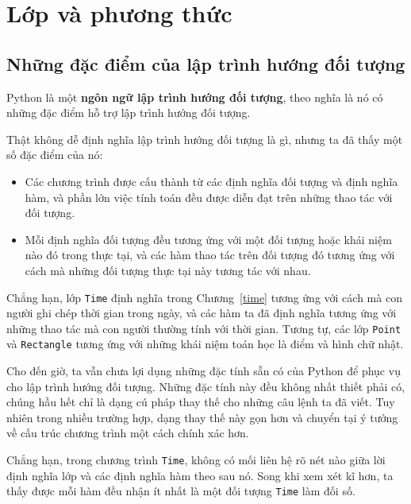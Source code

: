 \documentclass[11pt]{book}
\begin{document}
\chapter{Lớp và phương thức}


\section{Những đặc điểm của lập trình hướng đối tượng}


Python là một {\bf ngôn ngữ lập trình hướng đối tượng}, theo nghĩa là nó
có những đặc điểm hỗ trợ lập trình hướng đối tượng.

Thật không dễ định nghĩa lập trình hướng đối tượng là gì, nhưng ta đã
thấy một số đặc điểm của nó:

\begin{itemize}

\item Các chương trình được cấu thành từ các định nghĩa đối tượng và
định nghĩa hàm, và phần lớn việc tính toán đều được diễn đạt trên
những thao tác với đối tượng.

\item Mỗi định nghĩa đối tượng đều tương ứng với một đối tượng hoặc
khái niệm nào đó trong thực tại, và các hàm thao tác trên đối tượng đó
tương ứng với cách mà những đối tượng thực tại này tương tác với nhau.

\end{itemize}

Chẳng hạn, lớp {\tt Time} định nghĩa trong Chương~\ref{time}
tương ứng với cách mà con người ghi chép thời gian trong ngày, và
các hàm ta đã định nghĩa tương ứng với những thao tác mà con người
thường tính với thời gian. Tương tự, các lớp {\tt Point} và {\tt Rectangle} 
tương ứng với những khái niệm toán học là điểm và hình chữ nhật.

Cho đến giờ, ta vẫn chưa lợi dụng những đặc tính sẵn có của Python
để phục vụ cho lập trình hướng đối tượng. Những đặc tính này đều không
nhất thiết  phải có, chúng hầu hết chỉ là dạng cú pháp thay thế cho những
câu lệnh ta đã viết. Tuy nhiên trong nhiều trường hợp, dạng thay thế này
gọn hơn và chuyển tại ý tưởng về cấu trúc chương trình một cách
chính xác hơn.

Chẳng hạn, trong chương trình {\tt Time}, không có mối liên hệ rõ nét
nào giữa lời định nghĩa lớp và các định nghĩa hàm theo sau nó. Song khi
xem xét kĩ hơn, ta thấy được mỗi hàm đều nhận ít nhất là một đối tượng
{\tt Time} làm đối số.
\end{document}
